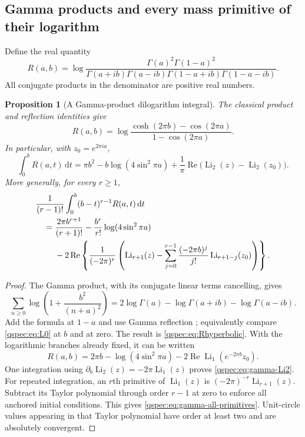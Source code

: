 \documentclass[11pt,letterpaper]{article}
\numberwithin{equation}{section}
\newtheorem{proposition}[theorem]{Proposition}
\theoremstyle{definition}
\newcommand{\Li}{\operatorname{Li}}
\newcommand{\Rea}{\operatorname{Re}}
\newcommand{\dd}{\,\mathrm{d}}
\begin{document}
\subsection{Gamma products and every mass primitive of their logarithm}
Define the real quantity
\begin{equation}\label{qspec:eq:Rgamma}
R(a,b)=\log\frac{\Gamma(a)^2\Gamma(1-a)^2}
 {\Gamma(a+ib)\Gamma(a-ib)\Gamma(1-a+ib)\Gamma(1-a-ib)}.
\end{equation}
All conjugate products in the denominator are positive real numbers.

\begin{proposition}[A Gamma-product dilogarithm integral]
\label{qspec:prop:gamma-integrals}
The classical product and reflection identities give
\begin{equation}\label{qspec:eq:Rhyperbolic}
R(a,b)=\log\frac{\cosh(2\pi b)-\cos(2\pi a)}{1-\cos(2\pi a)}.
\end{equation}
In particular, with $z_0=e^{2\pi ia}$,
\begin{equation}\label{qspec:eq:gamma-Li2}
\int_0^b R(a,t)\dd t
=\pi b^2-b\log(4\sin^2\pi a)
+\frac1\pi\Rea\bigl(\Li_2(z)-\Li_2(z_0)\bigr).
\end{equation}
More generally, for every $r\ge1$,
\begin{align}
&\frac1{(r-1)!}\int_0^b(b-t)^{r-1}R(a,t)\dd t\notag\\
&\quad=\frac{2\pi b^{r+1}}{(r+1)!}
-\frac{b^r}{r!}\log(4\sin^2\pi a)\notag\\
&\qquad\ -2\Rea\left\{\frac1{(-2\pi)^r}
\left(\Li_{r+1}(z)-\sum_{j=0}^{r-1}\frac{(-2\pi b)^j}{j!}
\Li_{r+1-j}(z_0)\right)\right\}.
\label{qspec:eq:gamma-all-primitives}
\end{align}
\end{proposition}
\begin{proof}
The Gamma product, with its conjugate linear terms cancelling, gives
\[
\sum_{n\ge0}\log\left(1+\frac{b^2}{(n+a)^2}\right)
=2\log\Gamma(a)-\log\Gamma(a+ib)-\log\Gamma(a-ib).
\]
Add the formula at $1-a$ and use Gamma reflection \cite{gamma}; equivalently
compare \eqref{qspec:eq:L0} at $b$ and at zero. The result is
\eqref{qspec:eq:Rhyperbolic}. With the logarithmic branches already fixed,
it can be written
\[
R(a,b)=2\pi b-\log(4\sin^2\pi a)-2\Rea\Li_1(e^{-2\pi b}z_0).
\]
One integration using $\partial_b\Li_2(z)=-2\pi\Li_1(z)$ proves
\eqref{qspec:eq:gamma-Li2}. For repeated integration, an $r$th primitive
of $\Li_1(z)$ is $(-2\pi)^{-r}\Li_{r+1}(z)$. Subtract its Taylor
polynomial through order $r-1$ at zero to enforce all anchored initial
conditions. This gives \eqref{qspec:eq:gamma-all-primitives}. Unit-circle
values appearing in that Taylor polynomial have order at least two and
are absolutely convergent.
\end{proof}
\end{document}
